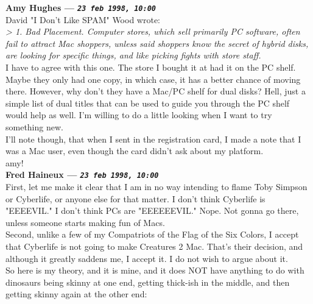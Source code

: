 \documentclass[11pt,twoside,a4paper]{article}
\begin{document}
\begin{multicols*}{2}
 
		
	
		
\textbf{Amy Hughes --- \emph{\texttt{23 feb 1998, 10:00}}}~\\

David "I Don't Like SPAM" Wood wrote:~\\
\emph{> 1. Bad Placement. Computer stores, which sell primarily PC software, often fail to attract Mac shoppers, unless said shoppers know the secret of hybrid disks, are looking for specific things, and like picking fights with store staff.}~\\

I have to agree with this one.  The store I bought it at had it on the PC shelf.  Maybe they only had one copy, in which case, it has a better chance of moving there.  However, why don't they have a Mac/PC shelf for dual disks?  Hell, just a simple list of dual titles that can be used to guide you through the PC shelf would help as well.  I'm willing to do a little looking when I want to try something new.~\\

I'll note though, that when I sent in the registration card, I made a note that I was a Mac user, even though the card didn't ask about my platform.~\\

amy!~\\

 
		
	
		
\textbf{Fred Haineux --- \emph{\texttt{23 feb 1998, 10:00}}}~\\

First, let me make it clear that I am in no way intending to flame Toby Simpson or Cyberlife, or anyone else for that matter. I don't think Cyberlife is "EEEEVIL." I don't think PCs are "EEEEEEVIL." Nope. Not gonna go there, unless someone starts making fun of Macs.~\\

Second, unlike a few of my Compatriots of the Flag of the Six Colors, I accept that Cyberlife is not going to make Creatures 2 Mac. That's their decision, and although it greatly saddens me, I accept it. I do not wish to argue about it.~\\

So here is my theory, and it is mine, and it does NOT have anything to do with dinosaurs being skinny at one end, getting thick-ish in the middle, and then getting skinny again at the other end:~\\


\end{multicols*}
\end{document}
